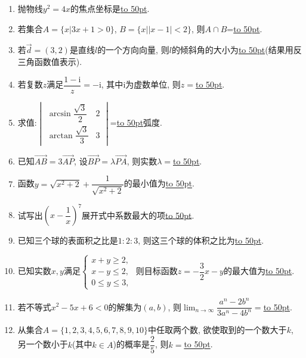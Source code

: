 \documentclass[10pt,a4paper]{article}
\newcommand{\blank}[1]{\underline{\hbox to #1pt{}}}
\begin{document}
\begin{enumerate}[1.]
\item 抛物线$y^2=4x$的焦点坐标是\blank{50}.
\item 若集合$A=\{x|3x+1>0\}$, $B=\{x||x-1|<2\}$, 则$A\cap B$=\blank{50}.  
\item 若$\overrightarrow d=(3,2)$是直线$l$的一个方向向量, 则$l$的倾斜角的大小为\blank{50}(结果用反三角函数值表示).
\item 若复数$z$满足$\dfrac{1-\mathrm{i}}z=-\mathrm{i}$, 其中$\mathrm{i}$为虚数单位, 则$z=$\blank{50}.  
\item 求值:$\begin{vmatrix}\arcsin\dfrac{\sqrt3}2 & 2  \\ \arctan\dfrac{\sqrt3}3 & 3  \end{vmatrix}$=\blank{50}弧度.  
\item 已知$\overrightarrow{AB}=3\overrightarrow{AP}$, 设$\overrightarrow{BP}=\lambda \overrightarrow{PA}$, 则实数$\lambda=$\blank{50}.
\item 函数$y=\sqrt{x^2+2}+\dfrac1{\sqrt{x^2+2}}$的最小值为\blank{50}.  
\item 试写出$(x-\dfrac1x)^7$展开式中系数最大的项\blank{50}.  
\item 已知三个球的表面积之比是$1:2:3$, 则这三个球的体积之比为\blank{50}.
\item 已知实数$x,y$满足$\begin{cases}x+y\ge 2, \\ x-y\le 2, \\ 0 \le y\le 3, \end{cases}$ 则目标函数$z=-\dfrac32x-y$的最大值为\blank{50}.  
\item 若不等式$x^2-5x+6<0$的解集为$(a,b)$, 则$\displaystyle\lim_{n\to\infty}\dfrac{a^n-2b^n}{3a^n-4b^n}=$\blank{50}.  
\item 从集合$A=\{1,2,3,4,5,6,7,8,9,10\}$中任取两个数, 欲使取到的一个数大于$k$, 另一个数小于$k$(其中$k\in A$)的概率是$\dfrac25$, 则$k=$\blank{50}.



\end{enumerate}
\end{document}
